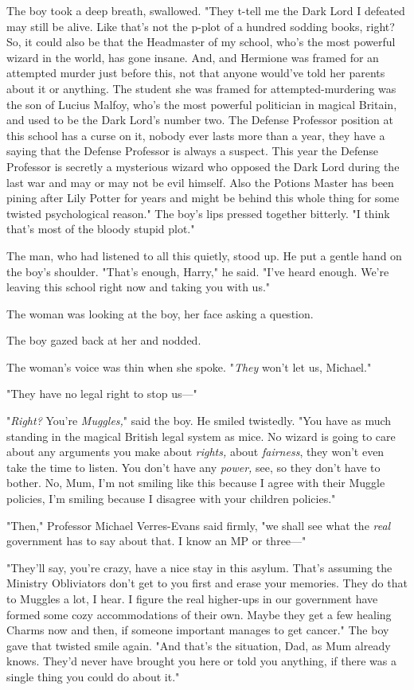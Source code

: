 The boy took a deep breath, swallowed. "They t-tell me the Dark Lord I defeated
may still be alive. Like that's not the p-plot of a hundred sodding books,
right? So, it could also be that the Headmaster of my school, who's the most
powerful wizard in the world, has gone insane. And, and Hermione was framed for
an attempted murder just before this, not that anyone would've told her parents
about it or anything. The student she was framed for attempted-murdering was
the son of Lucius Malfoy, who's the most powerful politician in magical
Britain, and used to be the Dark Lord's number two. The Defense Professor
position at this school has a curse on it, nobody ever lasts more than a year,
they have a saying that the Defense Professor is always a suspect. This year
the Defense Professor is secretly a mysterious wizard who opposed the Dark Lord
during the last war and may or may not be evil himself. Also the Potions Master
has been pining after Lily Potter for years and might be behind this whole
thing for some twisted psychological reason." The boy's lips pressed together
bitterly. "I think that's most of the bloody stupid plot."

The man, who had listened to all this quietly, stood up. He put a gentle hand
on the boy's shoulder. "That's enough, Harry," he said. "I've heard enough.
We're leaving this school right now and taking you with us."

The woman was looking at the boy, her face asking a question.

The boy gazed back at her and nodded.

The woman's voice was thin when she spoke. "\emph{They} won't let us, Michael."

"They have no legal right to stop us\mbox{---}"

"\emph{Right?} You're \emph{Muggles,}" said the boy. He smiled twistedly. "You
have as much standing in the magical British legal system as mice. No wizard is
going to care about any arguments you make about \emph{rights,} about
\emph{fairness}, they won't even take the time to listen. You don't have any
\emph{power,} see, so they don't have to bother. No, Mum, I'm not smiling like
this because I agree with their Muggle policies, I'm smiling because I disagree
with your children policies."

"Then," Professor Michael Verres-Evans said firmly, "we shall see what the
\emph{real} government has to say about that. I know an MP or three\mbox{---}"

"They'll say, you're crazy, have a nice stay in this asylum. That's assuming
the Ministry Obliviators don't get to you first and erase your memories. They
do that to Muggles a lot, I hear. I figure the real higher-ups in our
government have formed some cozy accommodations of their own. Maybe they get a
few healing Charms now and then, if someone important manages to get cancer."
The boy gave that twisted smile again. "And that's the situation, Dad, as Mum
already knows. They'd never have brought you here or told you anything, if
there was a single thing you could do about it."

